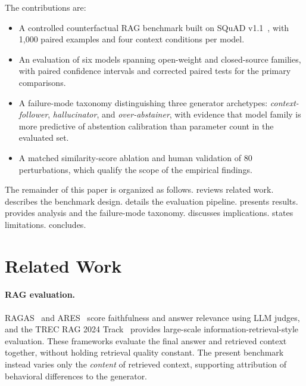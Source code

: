 \documentclass[11pt]{article}
\begin{document}
\noindent The contributions are:
\begin{itemize}[noitemsep]
  \item A controlled counterfactual RAG benchmark built on SQuAD
        v1.1~\cite{rajpurkar2016squad}, with 1{,}000 paired examples and four context
        conditions per model.
  \item An evaluation of six models spanning open-weight and closed-source families,
        with paired confidence intervals and corrected paired tests for the primary
        comparisons.
  \item A failure-mode taxonomy distinguishing three generator archetypes:
        \emph{context-follower}, \emph{hallucinator}, and \emph{over-abstainer}, with
        evidence that model family is more predictive of abstention calibration than
        parameter count in the evaluated set.
  \item A matched similarity-score ablation and human validation of 80 perturbations,
        which qualify the scope of the empirical findings.
\end{itemize}

The remainder of this paper is organized as follows.  reviews related
work.  describes the benchmark design.  details
the evaluation pipeline.  presents results. 
provides analysis and the failure-mode taxonomy.  discusses
implications.  states limitations.  concludes.
\FloatBarrier
\section{Related Work}
\label{sec:related}

\paragraph{RAG evaluation.}
RAGAS~\cite{es2023ragas} and ARES~\cite{saadfalcon2023ares} score faithfulness and answer
relevance using LLM judges, and the TREC RAG 2024 Track~\cite{trec2024rag} provides
large-scale information-retrieval-style evaluation. These frameworks evaluate the final
answer and retrieved context together, without holding retrieval quality constant. The
present benchmark instead varies only the \emph{content} of retrieved context, supporting
attribution of behavioral differences to the generator.
\end{document}
